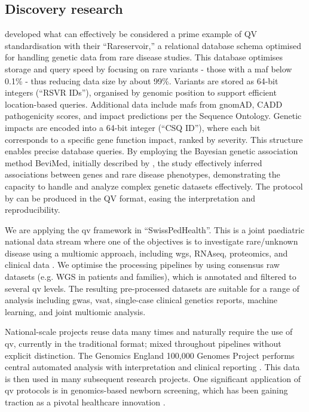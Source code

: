 \subsection{Discovery research}
\citet{greene2023genetic} developed what can effectively be considered a prime example of QV standardisation with their ``Rareservoir,'' a relational database schema optimised for handling genetic data from rare disease studies.
This database optimises storage and query speed by focusing on rare variants - those with a \ac{maf} below 0.1\% - thus reducing data size by about 99\%. Variants are stored as 64-bit integers (``RSVR IDs''), organised by genomic position to support efficient location-based queries. 
Additional data include \ac{maf}s from gnomAD, CADD pathogenicity scores, and impact predictions per the Sequence Ontology. Genetic impacts are encoded into a 64-bit integer (``CSQ ID''), where each bit corresponds to a specific gene function impact, ranked by severity. 
This structure enables precise database queries. 
By employing the Bayesian genetic association method BeviMed, initially described by \citet{greene2017fast}, the study effectively inferred associations between genes and rare disease phenotypes, demonstrating the capacity to handle and analyze complex genetic datasets effectively.
 The protocol by \citet{greene2023genetic} can be produced in the QV format, easing the interpretation and reproducibility.

We are applying the \ac{qv} framework in ``SwissPedHealth''. 
This is a joint paediatric national data stream where one of the objectives is to investigate rare/unknown disease using a multiomic approach, including \ac{wgs}, RNAseq, proteomics, and clinical data
\cite{mozun2024paediatric}.
We optimise the processing pipelines by using consensus raw datasets (e.g. WGS in patients and families), which is annotated and filtered to several \ac{qv} levels.
The resulting pre-processed datasets are suitable for a range of analysis including \ac{gwas}, \ac{vsat}, single-case clinical genetics reports, machine learning, and joint multiomic analysis. 

National-scale projects reuse data many times and naturally require the use of \ac{qv}, currently in the traditional format; mixed throughout pipelines without explicit distinction.
The  Genomics England 100,000 Genomes Project performs central automated analysis with interpretation and clinical reporting \cite{turnbull2018100}. 
This data is then used in many subsequent research projects. 
One significant application of \ac{qv} protocols is in genomics-based newborn screening, which has been gaining traction as a pivotal healthcare innovation
\cite{noauthor_every_2024}. 

